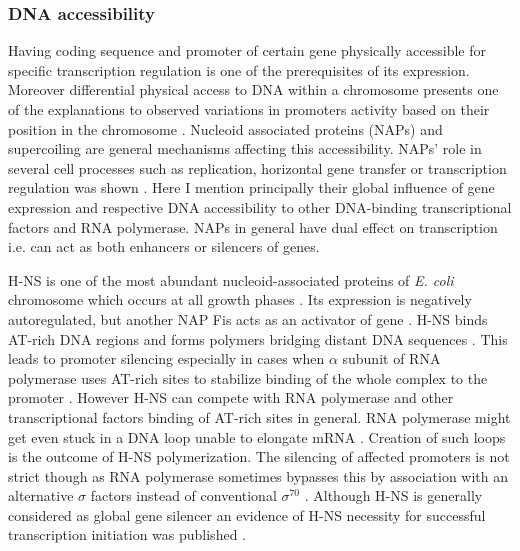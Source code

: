 
\subsubsection{DNA accessibility}
Having coding sequence and promoter of certain gene physically accessible for specific transcription regulation is one of the prerequisites of its expression.
Moreover differential physical access to DNA within a chromosome presents one of the explanations to observed variations in promoters activity based on their position in the chromosome \cite{bryant2014chromosome}.
Nucleoid associated proteins (NAPs) and supercoiling are general mechanisms affecting this accessibility.
NAPs' role in several cell processes such as replication, horizontal gene transfer or transcription regulation was shown \cite{dixon1984protein, kayoko1992histone, aznar2013hha}.
Here I mention principally their global influence of gene expression and respective DNA accessibility to other DNA-binding transcriptional factors and RNA polymerase.
NAPs in general have dual effect on transcription i.e. can act as both enhancers or silencers of genes.

H-NS is one of the most abundant nucleoid-associated proteins of \textit{E. coli} chromosome which occurs at all growth phases \cite{azam1999growth}.
Its expression is negatively autoregulated, but another NAP Fis acts as an activator of  gene \cite{ueguchi1993autoregulatory, falconi1996antagonistic}.
H-NS binds AT-rich DNA regions and forms polymers bridging distant DNA sequences  \cite{navarre2006selective, arold2010h}.
This leads to promoter silencing especially in cases when $\alpha$ subunit of RNA polymerase uses AT-rich sites to stabilize binding of the whole complex to the promoter \cite{singh2013h}.
However H-NS can compete with RNA polymerase and other transcriptional factors binding of AT-rich sites in general.
RNA polymerase might get even stuck in a DNA loop unable to elongate mRNA \cite{dame2002structural}.
Creation of such loops is the outcome of H-NS polymerization.
The silencing of affected promoters is not strict though as RNA polymerase sometimes bypasses this by association with an alternative $\sigma$ factors instead of conventional $\sigma^{70}$ \cite{grainger2008selective}.
Although H-NS is generally considered as global gene silencer an evidence of H-NS necessity for successful transcription initiation was published \cite{singh2013h}.

